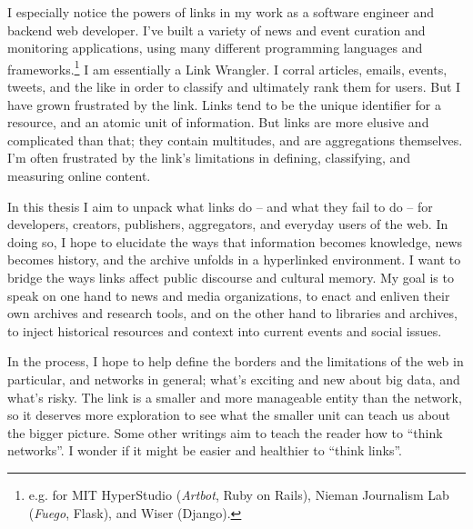 
I especially notice the powers of links in my work as a software engineer and backend web developer. I've built a variety of news and event curation and monitoring applications, using many different programming languages and frameworks.\footnote{e.g. for MIT HyperStudio (\emph{Artbot}, Ruby on Rails), Nieman Journalism Lab (\emph{Fuego}, Flask), and Wiser (Django).} I am essentially a Link Wrangler. I corral articles, emails, events, tweets, and the like in order to classify and ultimately rank them for users. But I have grown frustrated by the link. Links tend to be the unique identifier for a resource, and an atomic unit of information. But links are more elusive and complicated than that; they contain multitudes, and are aggregations themselves. I'm often frustrated by the link's limitations in defining, classifying, and measuring online content.


In this thesis I aim to unpack what links do -- and what they fail to do -- for developers, creators, publishers, aggregators, and everyday users of the web. In doing so, I hope to elucidate the ways that information becomes knowledge, news becomes history, and the archive unfolds in a hyperlinked environment. I want to bridge the ways links affect public discourse and cultural memory. %
My goal is to speak on one hand to news and media organizations, to enact and enliven their own archives and research tools, and on the other hand to libraries and archives, to inject historical resources and context into current events and social issues.

In the process, I hope to help define the borders and the limitations of the web in particular, and networks in general; what's exciting and new about big data, and what's risky. The link is a smaller and more manageable entity than the network, so it deserves more exploration to see what the smaller unit can teach us about the bigger picture. Some other writings aim to teach the reader how to ``think networks''. I wonder if it might be easier and healthier to ``think links''.


